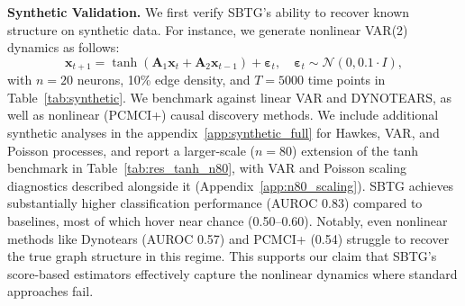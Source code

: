 \documentclass{article}
\theoremstyle{plain}
\theoremstyle{definition}
\theoremstyle{remark}
\newcommand{\1}{\mathbf{1}}
\newcommand{\x}{\bm{x}}
\newcommand{\eps}{\bm{\varepsilon}}
\newcommand{\A}{\bm{A}}
\begin{document}
\textbf{Synthetic Validation.} We first verify SBTG’s ability to recover known structure on synthetic data. For instance, we generate nonlinear VAR(2) dynamics as follows:
\begin{equation*}
\x_{t+1} = \tanh(\A_1 \x_t + \A_2 \x_{t-1}) + \eps_t, \quad \eps_t \sim \mathcal{N}(0, 0.1 \cdot I),
\end{equation*}
with $n = 20$ neurons, 10\% edge density, and $T = 5000$ time points in Table~\ref{tab:synthetic}. We benchmark against  linear VAR and DYNOTEARS, as well as nonlinear (PCMCI+) causal discovery methods. We include additional synthetic analyses in the appendix~\ref{app:synthetic_full} for Hawkes, VAR, and Poisson processes, and report a larger-scale ($n{=}80$) extension of the tanh benchmark in Table~\ref{tab:res_tanh_n80}, with VAR and Poisson scaling diagnostics described alongside it (Appendix~\ref{app:n80_scaling}).
SBTG achieves substantially higher classification performance (AUROC 0.83) compared to baselines, most of which hover near chance (0.50--0.60). Notably, even nonlinear methods like Dynotears (AUROC 0.57) and PCMCI+ (0.54) struggle to recover the true graph structure in this regime. This supports our claim that SBTG's score-based estimators effectively capture the nonlinear dynamics where standard approaches fail.
\end{document}
